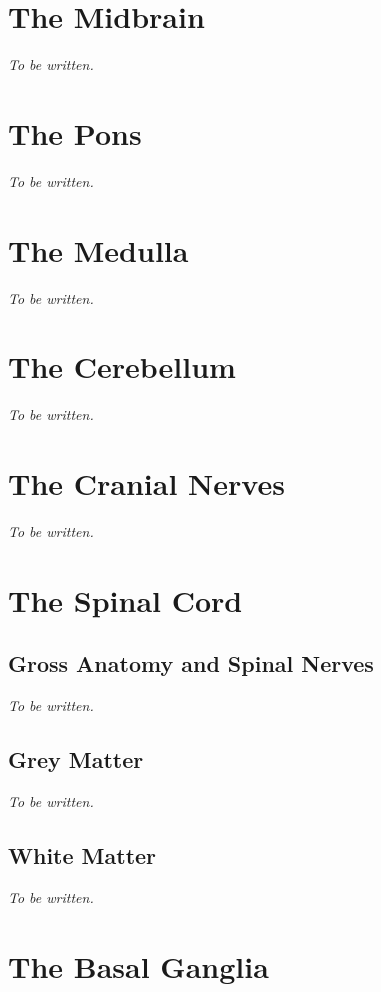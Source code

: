 \documentclass[11pt]{article}
\newcommand{\tobewritten}{\noindent\textit{To be written.}}
\begin{document}
\section{The Midbrain}

\tobewritten


\section{The Pons}

\tobewritten


\section{The Medulla}

\tobewritten


\section{The Cerebellum}

\tobewritten


\section{The Cranial Nerves}

\tobewritten


\section{The Spinal Cord}

\subsection{Gross Anatomy and Spinal Nerves}

\tobewritten

\subsection{Grey Matter}

\tobewritten

\subsection{White Matter}

\tobewritten


\section{The Basal Ganglia}
\end{document}
